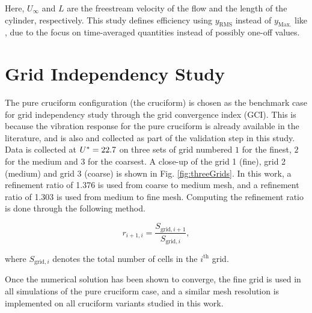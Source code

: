 \documentclass[oneside]{utmthesis}
\begin{document}
\noindent Here, $U_{\infty}$ and $L$ are the freestream velocity of the flow and the length of the cylinder, respectively. This study defines efficiency using $y_{\text{RMS}}$ instead of $y_{\text{Max.}}$ like \citet{Sun2018}, due to the focus on time-averaged quantities instead of possibly one-off values.

\section{Grid Independency Study} \label{sec:gridIndStu}

The pure cruciform configuration (the \angfi{} cruciform) is chosen as the benchmark case for grid independency study through the grid convergence index (GCI). This is because the vibration response for the pure cruciform is already available in the literature, and is also and collected as part of the validation step in this study. Data is collected at $U^{*} = 22.7$ on three sets of grid numbered $1$ for the finest, $2$ for the medium and $3$ for the coarsest. A close-up of the grid 1 (fine), grid 2 (medium) and grid 3 (coarse) is shown in Fig. \ref{fig:threeGrids}. In this work, a refinement ratio of 1.376 is used from coarse to medium mesh, and a refinement ratio of 1.303 is used from medium to fine mesh. Computing the refinement ratio is done through the following method.

\begin{equation}
  r_{i+1,i} = \frac{S_{\text{grid},i+1}}{S_{\text{grid},i}},
  \label{eq:refinementRatio}
\end{equation}

\noindent where $S_{\text{grid},i}$ denotes the total number of cells in the $i^{\text{th}}$ grid.

Once the numerical solution has been shown to converge, the fine grid is used in all simulations of the pure cruciform case, and a similar mesh resolution is implemented on all cruciform variants studied in this work.
\end{document}
